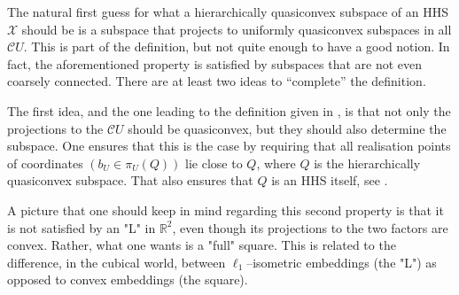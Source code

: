 \documentclass[11pt,oneside]{amsart}
\theoremstyle{definition}
\newcommand{\cuco}[1]{{\mathcal #1}}
\newcommand{\fontact}{{\mathcal C}}
\begin{document}
The natural first guess for what a hierarchically quasiconvex subspace of an HHS $\cuco X$ should be is a subspace that projects to uniformly quasiconvex subspaces in all $\fontact U$. This is part of the definition, but not quite enough to have a good notion. In fact, the aforementioned property is satisfied by subspaces that are not even coarsely connected. There are at least two ideas to ``complete'' the definition.

The first idea, and the one leading to the definition given in \cite{HHS2}, is that not only the projections to the $\fontact U$ should be quasiconvex, but they should also determine the subspace. One ensures that this is the case by requiring that all realisation points of coordinates $(b_U\in\pi_U(Q))$ lie close to $Q$, where $Q$ is the hierarchically quasiconvex subspace. That also ensures that $Q$ is an HHS itself, see \cite[Proposition 5.6]{HHS2}.

A picture that one should keep in mind regarding this second property is that it is not satisfied by an "L" in $\mathbb{R}^2$, even though its projections to the two factors are convex. Rather, what one wants is a "full" square. This is related to the difference, in the cubical world, between $\ell_1$--isometric embeddings (the "L") as opposed to convex embeddings (the square).

\end{document}
